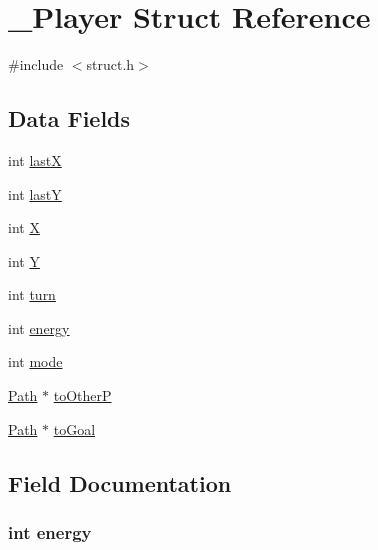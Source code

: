 \hypertarget{struct___player}{}\section{\+\_\+\+Player Struct Reference}
\label{struct___player}


{\ttfamily \#include $<$struct.\+h$>$}

\subsection*{Data Fields}
\begin{DoxyCompactItemize}
\item 
int \hyperlink{struct___player_a7bb8b2cfc1aec0db2429c600cddccf17}{lastX}
\item 
int \hyperlink{struct___player_ae135df8cfc9b15d97e97b400a5cbc768}{lastY}
\item 
int \hyperlink{struct___player_a80c0944640e62d3ed6c5419c1bcc0c88}{X}
\item 
int \hyperlink{struct___player_aa482c4cc86a24474e4fb19b5b5978778}{Y}
\item 
int \hyperlink{struct___player_aaefa47f4fdf865c2358c22b542a993e4}{turn}
\item 
int \hyperlink{struct___player_a4ec8c7cb48771b844a6d50e2150e3f63}{energy}
\item 
int \hyperlink{struct___player_a1ea5d0cb93f22f7d0fdf804bd68c3326}{mode}
\item 
\hyperlink{struct_8h_adf1ebd47eaeca3035384408cd5faefa5}{Path} $\ast$ \hyperlink{struct___player_acb6bf1fa3b8884d0c9ce0b566a534bcc}{to\+OtherP}
\item 
\hyperlink{struct_8h_adf1ebd47eaeca3035384408cd5faefa5}{Path} $\ast$ \hyperlink{struct___player_ac7fee391a1ea765fcd9a813684459133}{to\+Goal}
\end{DoxyCompactItemize}


\subsection{Field Documentation}
\subsubsection[{\texorpdfstring{energy}{energy}}]{\setlength{\rightskip}{0pt plus 5cm}int energy}\hypertarget{struct___player_a4ec8c7cb48771b844a6d50e2150e3f63}{}\label{struct___player_a4ec8c7cb48771b844a6d50e2150e3f63}
